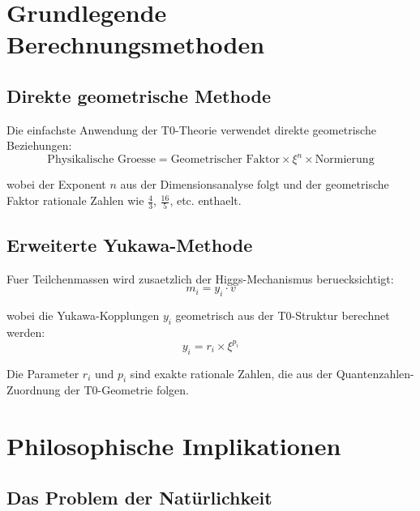 \documentclass[12pt,a4paper]{article}
\begin{document}
	\section{Grundlegende Berechnungsmethoden}

\subsection{Direkte geometrische Methode}

Die einfachste Anwendung der T0-Theorie verwendet direkte geometrische Beziehungen:
\begin{equation}
	\text{Physikalische Groesse} = \text{Geometrischer Faktor} \times \xi^n \times \text{Normierung}
	\label{eq:direct_method}
\end{equation}

wobei der Exponent $n$ aus der Dimensionsanalyse folgt und der geometrische Faktor rationale Zahlen wie $\frac{4}{3}$, $\frac{16}{5}$, etc. enthaelt.

\subsection{Erweiterte Yukawa-Methode}

Fuer Teilchenmassen wird zusaetzlich der Higgs-Mechanismus beruecksichtigt:
\begin{equation}
	m_i = y_i \cdot v
	\label{eq:yukawa_method}
\end{equation}

wobei die Yukawa-Kopplungen $y_i$ geometrisch aus der T0-Struktur berechnet werden:
\begin{equation}
	y_i = r_i \times \xi^{p_i}
	\label{eq:yukawa_coupling}
\end{equation}

Die Parameter $r_i$ und $p_i$ sind exakte rationale Zahlen, die aus der Quantenzahlen-Zuordnung der T0-Geometrie folgen.
	\section{Philosophische Implikationen}
	
	\subsection{Das Problem der Natürlichkeit}
	
\end{document}
